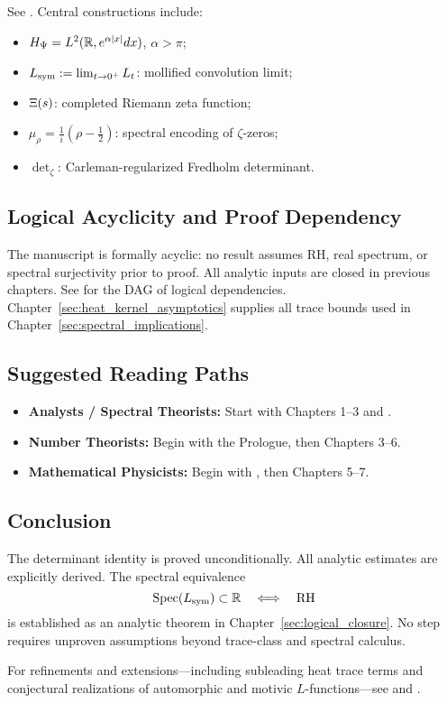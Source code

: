 See . Central constructions include:
\begin{itemize}
  \item \( H_{\Psi} = L^2(\mathbb{R}, e^{\alpha|x|} dx) \), \( \alpha > \pi \);
  \item \( L_{\mathrm{sym}} := \lim_{t \to 0^+} L_t \): mollified convolution limit;
  \item \( \Xi(s) \): completed Riemann zeta function;
  \item \( \mu_\rho = \frac{1}{i}(\rho - \tfrac{1}{2}) \): spectral encoding of \( \zeta \)-zeros;
  \item \( \det\nolimits_\zeta \): Carleman-regularized Fredholm determinant.
\end{itemize}

\subsection*{Logical Acyclicity and Proof Dependency}

The manuscript is formally acyclic: no result assumes RH, real spectrum, or spectral surjectivity prior to proof. All analytic inputs are closed in previous chapters. See  for the DAG of logical dependencies. Chapter~\ref{sec:heat_kernel_asymptotics} supplies all trace bounds used in Chapter~\ref{sec:spectral_implications}.

\subsection*{Suggested Reading Paths}

\begin{itemize}
  \item \textbf{Analysts / Spectral Theorists:} Start with Chapters 1–3 and .
  \item \textbf{Number Theorists:} Begin with the Prologue, then Chapters 3–6.
  \item \textbf{Mathematical Physicists:} Begin with , then Chapters 5–7.
\end{itemize}

\subsection*{Conclusion}

The determinant identity is proved unconditionally. All analytic estimates are explicitly derived. The spectral equivalence
\[
\operatorname{Spec}(L_{\mathrm{sym}}) \subset \mathbb{R} \quad \Longleftrightarrow \quad \mathrm{RH}
\]
is established as an analytic theorem in Chapter~\ref{sec:logical_closure}. No step requires unproven assumptions beyond trace-class and spectral calculus.

\medskip
\noindent
For refinements and extensions—including subleading heat trace terms and conjectural realizations of automorphic and motivic \( L \)-functions—see  and .
